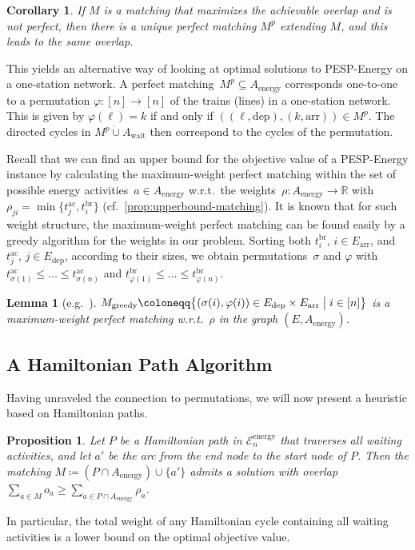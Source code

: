 \documentclass[11pt,a4paper]{article}
\newcommand{\dotcup}{\mathbin{\dot\cup}}
\newcommand{\arr}{\mathrm{arr}}
\newcommand{\dep}{\mathrm{dep}}
\newcommand{\wait}{\mathrm{wait}}
\newcommand{\energy}{\mathrm{energy}}
\newcommand{\energyact}{M}               %
\newcommand{\possenergyact}{A_{\energy}} %
\newcommand{\ac}{\mathrm{ac}}
\newcommand{\br}{\mathrm{br}}
\newcommand{\pespenergy}{PESP-Energy\xspace}
\newcommand{\osn}{one-station network\xspace}
\newcommand{\w}{\rho} %
\newcommand{\R}{\mathbb R}
\newcommand{\cE}{\mathcal{E}}
\newtheorem{proposition}[theorem]{Proposition}
\newtheorem{corollary}[theorem]{Corollary}
\newtheorem{lemma}[theorem]{Lemma}
\theoremstyle{definition}
\theoremstyle{remark}
\begin{document}
\begin{corollary} \label{cor:extension-perfect-matching}
 If $\energyact$ is a matching that maximizes the achievable overlap and is not perfect, then there is a unique perfect matching $\energyact^p$ extending $\energyact$, and this leads to the same overlap.
\end{corollary}

This yields an alternative way of looking at optimal solutions to \pespenergy on a \osn. A perfect matching~$\energyact^{p} \subseteq \possenergyact$ corresponds one-to-one to a permutation $\varphi \colon [n] \to [n]$ of the trains (lines) in a \osn. This is given by $\varphi(\ell) = k$ if and only if $((\ell,\dep),(k,\arr)) \in \energyact^p$. The directed cycles in $\energyact^p \dotcup A_\wait$ then correspond to the cycles of the permutation.

Recall that we can find an upper bound for the objective value of a \pespenergy instance by calculating the maximum-weight perfect matching within the set of possible energy activities~$a \in \possenergyact$ w.r.t.\ the weights~$\w \colon A_{\energy} \to \R$ with $\w_{ji} = \min\{ t_{j}^{\ac}, t_{i}^{\br}\}$ (cf.~\cref{prop:upperbound-matching}). It is known that for such weight structure, the maximum-weight perfect matching can be found easily by a greedy algorithm for the weights in our problem. Sorting both $t^{\br}_i$, $i \in E_{\arr}$, and $t^{\ac}_j$, $j \in E_{\dep}$, according to their sizes, we obtain permutations~$\sigma$ and $\varphi$ with $t^{\ac}_{\sigma(1)}\leq \dots \leq t^{\ac}_{\sigma(n)}$ and  $t^{\br}_{\varphi(1)} \leq \dots \leq t^{\br}_{\varphi(n)}$.

\begin{lemma}[{e.g.~\cite[Lemma~1]{vanDal}}]\label{lem:greedy}
$\energyact_\mathrm{greedy} \coloneqq \bigl\{(\sigma(i), \varphi(i)) \in E_{\dep} \times E_{\arr} \bigm| i \in [n]\bigr\}$ is a maximum-weight perfect matching w.r.t.\ $\w$ in the graph $(E, A_\energy)$.
\end{lemma}


\subsection{A Hamiltonian Path Algorithm}

Having unraveled the connection to permutations, we will now present a heuristic based on Hamiltonian paths.

\begin{proposition}\label{prop:lowerbound-ham}
    Let $P$ be a Hamiltonian path in $\cE_n^\energy$ that traverses all waiting activities, and let $a'$ be the arc from the end node to the start node of $P$. Then the matching $\energyact \coloneqq (P \cap A_\energy) \cup \{a'\}$ admits a solution with overlap $\sum_{a \in \energyact} o_a \ge \sum_{a \in P \cap A_\energy} \w_a$.
\end{proposition}
In particular, the total weight of any Hamiltonian cycle containing all waiting activities is a lower bound on the optimal objective value.
\end{document}

